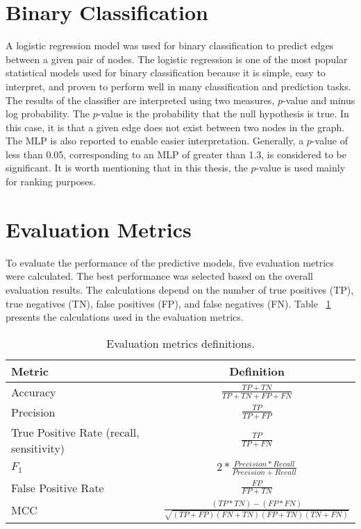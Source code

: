 \section{Binary Classification}

A logistic regression model was used for binary classification to predict edges between a given pair of nodes. The logistic regression is one of the most popular statistical models used for binary classification because it is simple, easy to interpret, and proven to perform well in many classification and prediction tasks.
The results of the classifier are interpreted using two measures, $p$-value and minus log probability. The $p$-value is the probability that the null hypothesis is true. In this case, it is that a given edge does not exist between two nodes in the graph. The \ac{MLP} is also reported to enable easier interpretation. Generally, a $p$-value of less than 0.05, corresponding to an \ac{MLP} of greater than 1.3,  is considered to be significant. It is worth mentioning that in this thesis, the $p$-value is used mainly for ranking purposes.

\section{Evaluation Metrics}
\label{evaluation_section}
To evaluate the performance of the predictive models, five evaluation metrics were calculated. The best performance was selected based on the overall evaluation results. The calculations depend on the number of true positives (TP), true negatives (TN), false positives (FP), and false negatives (FN). Table ~\ref{tab:evaluation} presents the calculations used in the evaluation metrics.

\begin{table}[ht]
    \centering
    \begin{tabular}{ |l|c| } 
        \hline
        \textbf{Metric} & \textbf{Definition} \\
        \hline
        Accuracy & $\frac{TP + TN}{TP + TN + FP + FN}$ \\ 
        \hline
        Precision & $\frac{TP}{TP + FP}$ \\
        \hline
        True Positive Rate (recall, sensitivity) & $\frac{TP}{TP + FN}$ \\ 
        \hline
        $F_{1}$ & $2 * \frac{Precision * Recall}{Precision + Recall}$ \\
        \hline
        False Positive Rate & $\frac{FP}{FP + TN}$ \\
        \hline
        \ac{MCC} & $\frac{(TP*TN)-(FP*FN)}{\sqrt{(TP + FP)(FN + TN)(FP + TN)(TN + FN)}}$ \\
        \hline
    \end{tabular}
    \caption{Evaluation metrics definitions.}
    \label{tab:evaluation}
\end{table}


